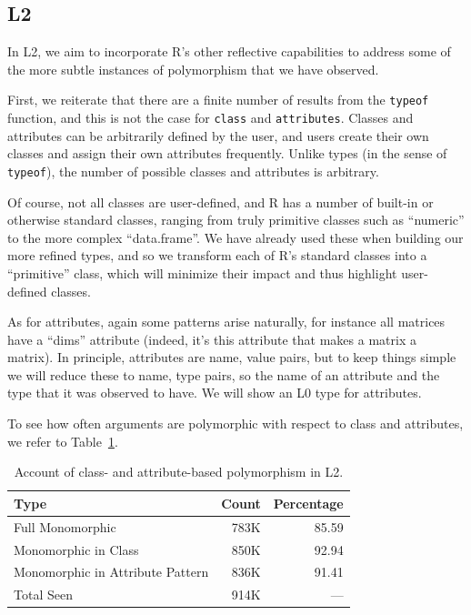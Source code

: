 \documentclass[acmsmall,10pt,review,anonymous]{acmart}\settopmatter{printfolios=true,printccs=false,printacmref=false}
\newcommand{\code}[1]{\lstinline|#1|\xspace}
\begin{document}
%
%
%
%
\subsection{L2}

In L2, we aim to incorporate R's other reflective capabilities to address some of the more subtle instances of polymorphism that we have observed.

First, we reiterate that there are a finite number of results from the {\tt typeof} function, and this is not the case for \code{class} and \code{attributes}.
Classes and attributes can be arbitrarily defined by the user, and users create their own classes and assign their own attributes frequently.
Unlike types (in the sense of \code{typeof}), the number of possible classes and attributes is arbitrary.

Of course, not all classes are user-defined, and R has a number of built-in or otherwise standard classes, ranging from truly primitive classes such as ``numeric'' to the more complex ``data.frame''.
We have already used these when building our more refined types, and so we transform each of R's standard classes into a ``primitive'' class, which will minimize their impact and thus highlight user-defined classes.

As for attributes, again some patterns arise naturally, for instance all matrices have a ``dims'' attribute (indeed, it's this attribute that makes a matrix a matrix).
In principle, attributes are name, value pairs, but to keep things simple we will reduce these to name, type pairs, so the name of an attribute and the type that it was observed to have.
We will show an L0 type for attributes.

To see how often arguments are polymorphic with respect to class and attributes, we refer to Table~\ref{tab:classcountsL2}.

\begin{table}[ht]
\label{tab:classcountsL2}
\centering
\begin{tabular}{lrr}
  \hline
Type & Count & Percentage \\ 
  \hline
Full Monomorphic & 783K & 85.59 \\ 
  Monomorphic in Class & 850K & 92.94 \\ 
  Monomorphic in Attribute Pattern & 836K & 91.41 \\ 
  Total Seen & 914K & --- \\ 
   \hline
\end{tabular}
\caption{Account of class- and attribute-based polymorphism in L2.}
\end{table}
\end{document}
